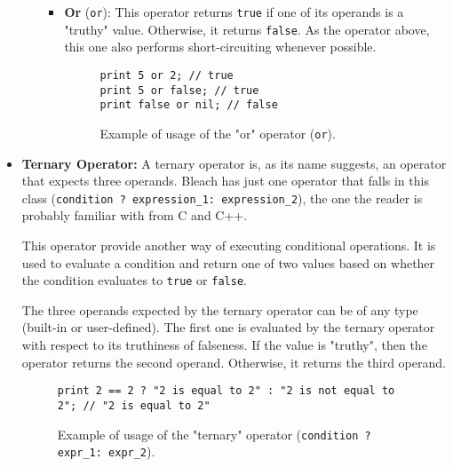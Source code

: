 \begin{itemize}
\begin{itemize}
\begin{itemize}
                    \item \textbf{Or} (\texttt{or}): This operator returns \texttt{true} if one of its operands is a "truthy" value. Otherwise, it returns \texttt{false}. As the operator above, this one also performs short-circuiting whenever possible.
                                        \begin{figure}[H]
                        \centering
                        \begin{lstlisting}
print 5 or 2; // true
print 5 or false; // true
print false or nil; // false
                        \end{lstlisting}
                        \caption{Example of usage of the "or" operator (\texttt{or}).}
                    \end{figure}
                \end{itemize}
        \end{itemize}
    \item \textbf{Ternary Operator:}
        A ternary operator is, as its name suggests, an operator that expects three operands. Bleach has just one operator that falls in this class (\texttt{condition ? expression\_1: expression\_2}), the one the reader is probably familiar with from C and C++.
    
        This operator provide another way of executing conditional operations. It is used to evaluate a condition and return one of two values based on whether the condition evaluates to \texttt{true} or \texttt{false}.

        The three operands expected by the ternary operator can be of any type (built-in or user-defined). The first one is evaluated by the ternary operator with respect to its truthiness of falseness. If the value is "truthy", then the operator returns the second operand. Otherwise, it returns the third operand.

        \begin{figure}[H]
            \centering
            \begin{lstlisting}
print 2 == 2 ? "2 is equal to 2" : "2 is not equal to 2"; // "2 is equal to 2"
            \end{lstlisting}
            \caption{Example of usage of the "ternary" operator (\texttt{condition ? expr\_1: expr\_2}).}
        \end{figure}


\end{itemize}
